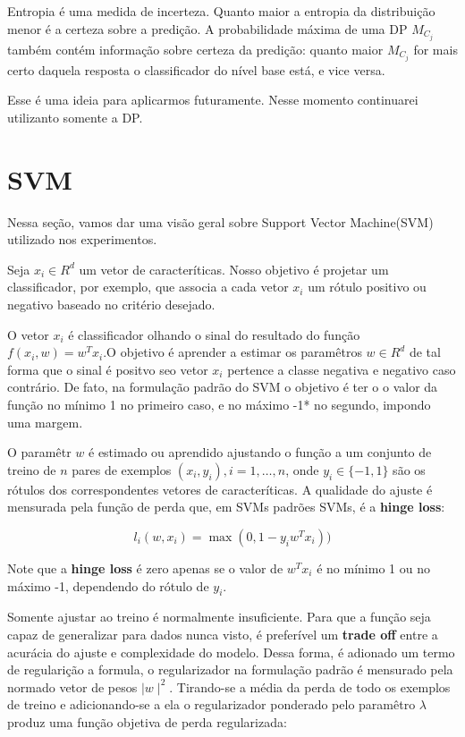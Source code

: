 \documentclass[]{book}
\begin{document}
Entropia é uma medida de incerteza. Quanto maior a entropia da
distribuição menor é a certeza sobre a predição. A probabilidade máxima
de uma DP \(M_{C_j}\) também contém informação sobre certeza da
predição: quanto maior \(M_{C_j}\) for mais certo daquela resposta o
classificador do nível base está, e vice versa.

Esse é uma ideia para aplicarmos futuramente. Nesse momento continuarei
utilizanto somente a DP.

\section{SVM}\label{svm}

Nessa seção, vamos dar uma visão geral sobre Support Vector Machine(SVM)
utilizado nos experimentos.

Seja \(x_i \in R^d\) um vetor de caracteríticas. Nosso objetivo é
projetar um classificador, por exemplo, que associa a cada vetor \(x_i\)
um rótulo positivo ou negativo baseado no critério desejado.

O vetor \(x_i\) é classificador olhando o sinal do resultado do função
\(f(x_i,w) = w^Tx_i\).O objetivo é aprender a estimar os paramêtros
\(w \in R^d\) de tal forma que o sinal é positvo seo vetor \(x_i\)
pertence a classe negativa e negativo caso contrário. De fato, na
formulação padrão do SVM o objetivo é ter o o valor da função no mínimo
1 no primeiro caso, e no máximo -1* no segundo, impondo uma margem.

O paramêtr \(w\) é estimado ou aprendido ajustando o função a um
conjunto de treino de \(n\) pares de exemplos \((x_i,y_i),i=1,…,n\),
onde \(y_i \in \{-1,1\}\) são os rótulos dos correspondentes vetores de
caracteríticas. A qualidade do ajuste é mensurada pela função de perda
que, em SVMs padrões SVMs, é a \textbf{hinge loss}:

\begin{equation}
l_i(w,x_i)=\max(0,1-y_iw^Tx_i))
\end{equation}

Note que a \textbf{hinge loss} é zero apenas se o valor de \(w^Tx_i\) é
no mínimo 1 ou no máximo -1, dependendo do rótulo de \(y_i\).

Somente ajustar ao treino é normalmente insuficiente. Para que a função
seja capaz de generalizar para dados nunca visto, é preferível um
\textbf{trade off} entre a acurácia do ajuste e complexidade do modelo.
Dessa forma, é adionado um termo de regularição a formula, o
regularizador na formulação padrão é mensurado pela normado vetor de
pesos \(\mid w\mid^2\). Tirando-se a média da perda de todo os exemplos
de treino e adicionando-se a ela o regularizador ponderado pelo
paramêtro \(\lambda\) produz uma função objetiva de perda regularizada:
\end{document}
